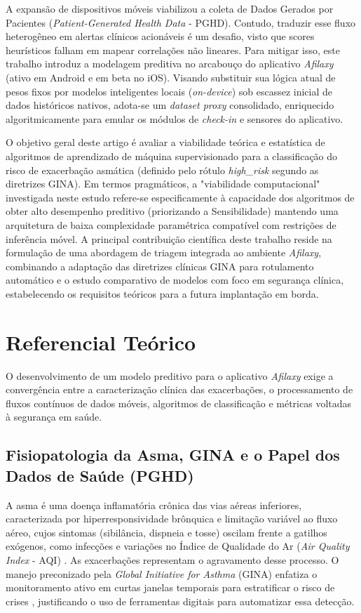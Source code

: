 \documentclass[12pt]{article}
\begin{document}
A expansão de dispositivos móveis viabilizou a coleta de Dados Gerados por Pacientes (\textit{Patient-Generated Health Data} - PGHD). Contudo, traduzir esse fluxo heterogêneo em alertas clínicos acionáveis é um desafio, visto que scores heurísticos falham em mapear correlações não lineares. Para mitigar isso, este trabalho introduz a modelagem preditiva no arcabouço do aplicativo \textit{Afilaxy} \cite{afilaxy2025} (ativo em Android e em beta no iOS). Visando substituir sua lógica atual de pesos fixos por modelos inteligentes locais (\textit{on-device}) sob escassez inicial de dados históricos nativos, adota-se um \textit{dataset proxy} consolidado, enriquecido algoritmicamente para emular os módulos de \textit{check-in} e sensores do aplicativo.

O objetivo geral deste artigo é avaliar a viabilidade teórica e estatística de algoritmos de aprendizado de máquina supervisionado para a classificação do risco de exacerbação asmática (definido pelo rótulo \textit{high\_risk} segundo as diretrizes GINA). Em termos pragmáticos, a "viabilidade computacional" investigada neste estudo refere-se especificamente à capacidade dos algoritmos de obter alto desempenho preditivo (priorizando a Sensibilidade) mantendo uma arquitetura de baixa complexidade paramétrica compatível com restrições de inferência móvel. A principal contribuição científica deste trabalho reside na formulação de uma abordagem de triagem integrada ao ambiente \textit{Afilaxy}, combinando a adaptação das diretrizes clínicas GINA para rotulamento automático e o estudo comparativo de modelos com foco em segurança clínica, estabelecendo os requisitos teóricos para a futura implantação em borda.

\section{Referencial Teórico} \label{sec:referencial}

O desenvolvimento de um modelo preditivo para o aplicativo \textit{Afilaxy} exige a convergência entre a caracterização clínica das exacerbações, o processamento de fluxos contínuos de dados móveis, algoritmos de classificação e métricas voltadas à segurança em saúde.

\subsection{Fisiopatologia da Asma, GINA e o Papel dos Dados de Saúde (PGHD)}
A asma é uma doença inflamatória crônica das vias aéreas inferiores, caracterizada por hiperresponsividade brônquica e limitação variável ao fluxo aéreo, cujos sintomas (sibilância, dispneia e tosse) oscilam frente a gatilhos exógenos, como infecções e variações no Índice de Qualidade do Ar (\textit{Air Quality Index} - AQI) \cite{guarnieri2014, ginasthma2024}. As exacerbações representam o agravamento desse processo. O manejo preconizado pela \textit{Global Initiative for Asthma} (GINA) enfatiza o monitoramento ativo em curtas janelas temporais para estratificar o risco de crises \cite{ginasthma2024}, justificando o uso de ferramentas digitais para automatizar essa detecção.
\end{document}
